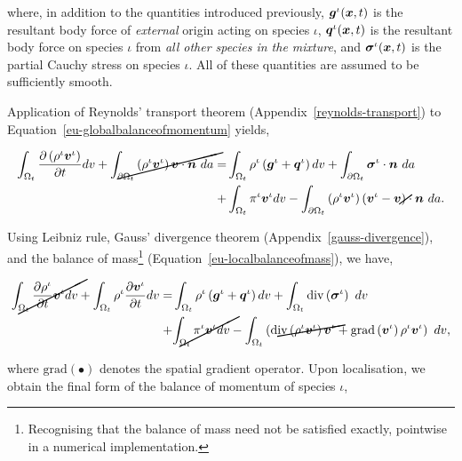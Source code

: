 \noindent where, in addition to the quantities introduced previously,
$\mbox{\boldmath$ g$}^{\iota}(\mbox{\boldmath$ x$},t)$ is the resultant body force of {\em external} origin
acting on species $\iota$, $\mbox{\boldmath$ q$}^{\iota}(\mbox{\boldmath$ x$},t)$ is the resultant body
force on species $\iota$ from {\em all other species in the mixture},
and $\mbox{\boldmath$\sigma$}^{\iota}(\mbox{\boldmath$ x$},t)$ is the partial Cauchy stress on species
$\iota$. All of these quantities are assumed to be sufficiently
smooth.

Application of Reynolds' transport theorem
(Appendix~\ref{reynolds-transport}) to
Equation~\ref{eu-globalbalanceofmomentum} yields,

\begin{equation*}
\begin{split}
\int_{\Omega_{t}} \frac{\partial \left(\rho^{\iota}\bv^{\iota}\right)}{\partial t} dv
+\cancel{\int_{\partial \Omega_{t}} \left(\rho^{\iota}\bv^{\iota}\right) \bv \cdot \bn\ da} =
& \int_{\Omega_{t}} \rho^{\iota} \left(\bg^{\iota}+\bq^{\iota}\right) dv 
+ \int_{\partial \Omega_{t}} \Bsigma^{\iota}\cdot\bn\ da\\
+ & \int_{\Omega_{t}} \pi^{\iota}\bv^{\iota} dv
- \int_{\partial \Omega_{t}} \left(\rho^{\iota} \bv^{\iota}
\right)\left(\bv^{\iota} - \cancel{\bv}\right) \cdot \bn\ da.
\end{split}
\end{equation*}

\noindent Using Leibniz rule, Gauss' divergence theorem
(Appendix~\ref{gauss-divergence}), and the balance of
mass{\footnote{Recognising that the balance of mass need not be
    satisfied exactly, pointwise in a numerical implementation.}}
(Equation~\ref{eu-localbalanceofmass}), we have,

\begin{equation*}
\begin{split}
\cancel{\int_{\Omega_{t}} \frac{\partial \rho^{\iota}} {\partial t}
\bv^{\iota} dv} + \int_{\Omega_{t}} \rho^{\iota} \frac{\partial
  \bv^{\iota}} {\partial t} dv = 
& \int_{\Omega_{t}} \rho^{\iota} \left(\bg^{\iota}+\bq^{\iota}\right) dv 
+ \int_{\Omega_{t}} \mathrm{div}\left(\Bsigma^{\iota}\right)\ dv\\
+ & \cancel{\int_{\Omega_{t}} \pi^{\iota}\bv^{\iota} dv}
- \int_{\Omega_{t}}\left(\cancel{\mathrm{div}
\left(\rho^{\iota}\bv^{\iota}\right) \bv^{\iota}} +
\mathrm{grad}\left(\bv^{\iota}\right) \rho^{\iota}\bv^{\iota}\right)\ dv, 
\end{split}
\end{equation*}

\noindent where $\mathrm{grad} (\bullet)$ denotes the spatial gradient
operator. Upon localisation, we obtain the final form of the balance
of momentum of species $\iota$, 


